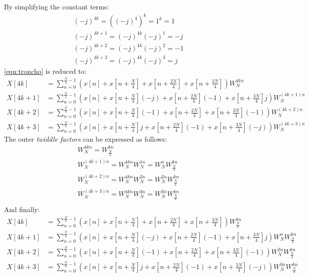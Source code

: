 By simplifying the constant terms:
\begin{gather}
	(-j)^{4k} = ((-j)^4)^k = 1^k = 1 \\
	(-j)^{4k + 1} = (-j)^{4k} (-j)^1 = -j \\
	(-j)^{4k + 2} = (-j)^{4k} (-j)^2 = -1 \\
	(-j)^{4k + 3} = (-j)^{4k} (-j)^3 = j
\end{gather}
\cref{eqn:troncho} is reduced to:
\begin{align}
	X[4k] &= \sum_{n = 0}^{\frac{N}{4} - 1} \left( x[n] + x\left[n + \frac{N}{4}\right] + x\left[n + \frac{2N}{4}\right] + x\left[n + \frac{3N}{4}\right] \right) W_N^{4kn} \\
	X[4k + 1] &= \sum_{n = 0}^{\frac{N}{4} - 1} \left( x[n] + x\left[n + \frac{N}{4}\right](-j) + x\left[n + \frac{2N}{4}\right](-1) + x\left[n + \frac{3N}{4}\right]j \right) W_N^{(4k + 1)n} \\
	X[4k + 2] &= \sum_{n = 0}^{\frac{N}{4} - 1} \left( x[n] + x\left[n + \frac{N}{4}\right](-1) + x\left[n + \frac{2N}{4}\right] + x\left[n + \frac{3N}{4}\right](-1) \right) W_N^{(4k + 2)n} \\
	X[4k + 3] &= \sum_{n = 0}^{\frac{N}{4} - 1} \left( x[n] + x\left[n + \frac{N}{4}\right]j + x\left[n + \frac{2N}{4}\right](-1) + x\left[n + \frac{3N}{4}\right](-j) \right) W_N^{(4k + 3)n}
\end{align}
The outer \textit{twiddle factors} can be expressed as follows:
\begin{gather}
	W_N^{4kn} = W_{\frac{N}{4}}^{kn} \\
	W_N^{(4k + 1)n} = W_N^{4kn} W_N^{1n} = W_N^nW_{\frac{N}{4}}^{kn} \\
	W_N^{(4k + 2)n} = W_N^{4kn} W_N^{2n} = W_N^{2n}W_{\frac{N}{4}}^{kn} \\
	W_N^{(4k + 3)n} = W_N^{4kn} W_N^{3n} = W_N^{3n}W_{\frac{N}{4}}^{kn} \\
\end{gather}
And finally:
\begin{align} \label{eqn:tocho2}
	X[4k] &= \sum_{n = 0}^{\frac{N}{4} - 1} \left( x[n] + x\left[n + \frac{N}{4}\right] + x\left[n + \frac{2N}{4}\right] + x\left[n + \frac{3N}{4}\right] \right)  W_{\frac{N}{4}}^{kn} \\
	X[4k + 1] &= \sum_{n = 0}^{\frac{N}{4} - 1} \left( x[n] + x\left[n + \frac{N}{4}\right](-j) + x\left[n + \frac{2N}{4}\right](-1) + x\left[n + \frac{3N}{4}\right]j \right) W_N^nW_{\frac{N}{4}}^{kn} \\
	X[4k + 2] &= \sum_{n = 0}^{\frac{N}{4} - 1} \left( x[n] + x\left[n + \frac{N}{4}\right](-1) + x\left[n + \frac{2N}{4}\right] + x\left[n + \frac{3N}{4}\right](-1) \right) W_N^{2n}W_{\frac{N}{4}}^{kn} \\
	X[4k + 3] &= \sum_{n = 0}^{\frac{N}{4} - 1} \left( x[n] + x\left[n + \frac{N}{4}\right]j + x\left[n + \frac{2N}{4}\right](-1) + x\left[n + \frac{3N}{4}\right](-j) \right) W_N^{3n}W_{\frac{N}{4}}^{kn}
\end{align}

